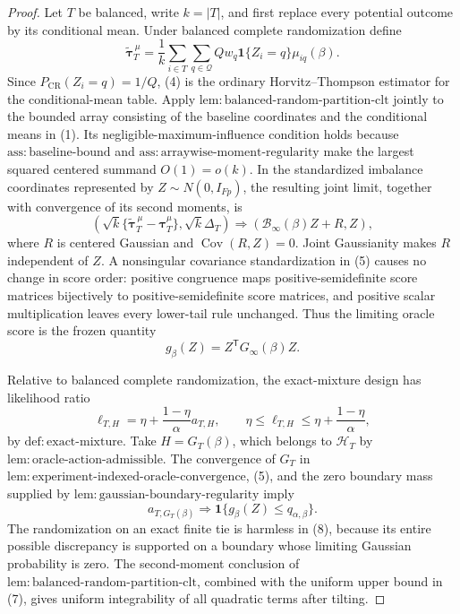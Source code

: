 \documentclass{article}
\begin{document}
\begin{proof}
Let \(T\) be balanced, write \(k=|T|\), and first replace every potential outcome by its conditional mean.  Under balanced complete randomization define
\[
\widetilde{\boldsymbol\tau}^{\,\mu}_T
=\frac1k\sum_{i\in T}\sum_{q\in\mathcal Q}
Qw_q\mathbf 1\{Z_i=q\}\mu_{iq}(\beta).
\tag{4}
\]
Since \(P_{\mathrm{CR}}(Z_i=q)=1/Q\), (4) is the ordinary Horvitz--Thompson estimator for the conditional-mean table.  Apply \(\mathrm{lem{:}balanced\text{-}random\text{-}partition\text{-}clt}\) jointly to the bounded array consisting of the baseline coordinates and the conditional means in (1).  Its negligible-maximum-influence condition holds because \(\mathrm{ass{:}baseline\text{-}bound}\) and \(\mathrm{ass{:}arraywise\text{-}moment\text{-}regularity}\) make the largest squared centered summand \(O(1)=o(k)\).  In the standardized imbalance coordinates represented by \(Z\sim N(0,I_{Fp})\), the resulting joint limit, together with convergence of its second moments, is
\[
\left(
\sqrt{k}\{\widetilde{\boldsymbol\tau}^{\,\mu}_T
-\boldsymbol\tau_T^\mu\},
\sqrt{k}\Delta_T
\right)
\Rightarrow
\left(\mathcal B_\infty(\beta)Z+R,Z\right),
\tag{5}
\]
where \(R\) is centered Gaussian and \(\operatorname{Cov}(R,Z)=0\).  Joint Gaussianity makes \(R\) independent of \(Z\).  A nonsingular covariance standardization in (5) causes no change in score order: positive congruence maps positive-semidefinite score matrices bijectively to positive-semidefinite score matrices, and positive scalar multiplication leaves every lower-tail rule unchanged.  Thus the limiting oracle score is the frozen quantity
\[
g_\beta(Z)=Z^{\mathsf T}G_\infty(\beta)Z.
\tag{6}
\]

Relative to balanced complete randomization, the exact-mixture design has likelihood ratio
\[
\ell_{T,H}
=\eta+\frac{1-\eta}{\alpha}a_{T,H},
\qquad
\eta\leq\ell_{T,H}\leq
\eta+\frac{1-\eta}{\alpha},
\tag{7}
\]
by \(\mathrm{def{:}exact\text{-}mixture}\).  Take \(H=G_T(\beta)\), which belongs to \(\mathcal H_T\) by \(\mathrm{lem{:}oracle\text{-}action\text{-}admissible}\).  The convergence of \(G_T\) in \(\mathrm{lem{:}experiment\text{-}indexed\text{-}oracle\text{-}convergence}\), (5), and the zero boundary mass supplied by \(\mathrm{lem{:}gaussian\text{-}boundary\text{-}regularity}\) imply
\[
a_{T,G_T(\beta)}
\Rightarrow
\mathbf 1\{g_\beta(Z)\leq q_{\alpha,\beta}\}.
\tag{8}
\]
The randomization on an exact finite tie is harmless in (8), because its entire possible discrepancy is supported on a boundary whose limiting Gaussian probability is zero.  The second-moment conclusion of \(\mathrm{lem{:}balanced\text{-}random\text{-}partition\text{-}clt}\), combined with the uniform upper bound in (7), gives uniform integrability of all quadratic terms after tilting.


\end{proof}
\end{document}
